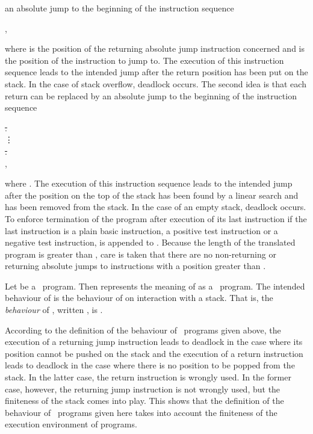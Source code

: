 \documentclass[fleqn]{llncs}
\begin{document}
an absolute jump to the beginning of the instruction sequence
\begin{ldispl}
\begin{aeqns}
 \conc {} \conc {}\;,
\end{aeqns}
\end{ldispl}where  is the position of the returning absolute jump instruction
concerned and  is the position of the instruction to jump to.
The execution of this instruction sequence leads to the intended jump
after the return position has been put on the stack.
In the case of stack overflow, deadlock occurs.
The second idea is that each return can be replaced by an absolute jump
to the beginning of the instruction sequence
\begin{ldispl}
\begin{aeqns}
 \conc {} \conc \st.\pop \conc {}
 \conc {} \\
\quad \vdots \\
 \conc {} \conc \st.\pop \conc {}
 \conc {} \\
\;,
\end{aeqns}
\end{ldispl}where .
The execution of this instruction sequence leads to the intended jump
after the position on the top of the stack has been found by a linear
search and has been removed from the stack.
In the case of an empty stack, deadlock occurs.
To enforce termination of the program after execution of its last
instruction if the last instruction is a plain basic instruction, a
positive test instruction or a negative test instruction,
 is appended to
.
Because the length of the translated program is greater than , care
is taken that there are no non-returning or returning absolute jumps to
instructions with a position greater than .

Let  be a \PGLDrj\ program.
Then  represents the meaning of  as a \PGLD\ program.
The intended behaviour of  is the behaviour of  on
interaction with a stack.
That is, the \emph{behaviour} of , written , is
.

According to the definition of the behaviour of \PGLDrj\ programs given
above, the execution of a returning jump instruction leads to deadlock
in the case where its position cannot be pushed on the stack and the
execution of a return instruction leads to deadlock in the case where
there is no position to be popped from the stack.
In the latter case, the return instruction is wrongly used.
In the former case, however, the returning jump instruction is not
wrongly used, but the finiteness of the stack comes into play.
This shows that the definition of the behaviour of \PGLDrj\ programs
given here takes into account the finiteness of the execution
environment of programs.
\end{document}
